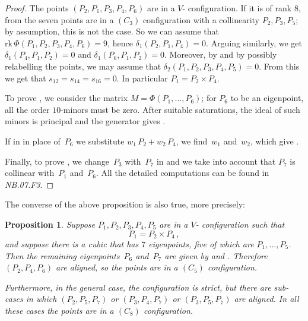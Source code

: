 \documentclass[a4paper, 11pt, reqno]{amsart}
\theoremstyle{plain}
\newtheorem{prop}[lemma]{Proposition}
\theoremstyle{definition}
\newcommand{\nb}[2]{\textsl{{NB}.{#1}.{#2}}}
\newcommand{\rk}{\ensuremath{\mathrm{rk}}}
\begin{document}
\begin{proof}
The points $(P_2, P_1, P_3, P_4, P_6)$ are in a
$V$- configuration. If it is of rank $8$, 
from  the seven points are in a $(C_3)$ configuration
with a collinearity $P_2, P_3,P_5$; by assumption, this is not the case. So
we can assume that $\rk \, \Phi(P_1, P_2, P_3, P_4, P_6) = 9$, hence $\delta_1(P_2, P_1, P_4)=0$.
Arguing similarly, we get $\delta_1(P_4, P_1, P_2) = 0$ and $\delta_1(P_6, P_1, P_2) = 0$. Moreover, by  and by possibly relabelling the points, we may assume that $\delta_2(P_1, P_2, P_3, P_4, P_5)=0$. From this we get that
$s_{12} = s_{14}=s_{16}=0$. In particular $P_1 = P_2 \times P_4$.

To prove , 
we consider the matrix $M = \Phi(P_1, \dots, P_6)$;
for $P_6$ to be an eigenpoint,
all the order $10$-minors must be zero. 
After suitable saturations, the ideal of such minors is principal and the generator gives .

If in  in place of~$P_6$ we substitute $w_1 \, P_2 + w_2 \, P_4$,
we find~$w_1$ and~$w_2$, which give .

Finally, to prove , we change~$P_3$ with~$P_7$ in  and we take into account that $P_7$ is collinear with~$P_1$ and~$P_6$. All the detailed computations can be found in \nb{07}{F3}.
\end{proof}
%
The converse of the above proposition is also true, more precisely:
\begin{prop}
   Suppose $P_1, P_2, P_3, P_4, P_5$ are in a $V$- configuration such that
%
\[
  P_1 = P_2 \times P_4 \,,
\]
%
and suppose there is a cubic that has $7$ eigenpoints, five of which are $P_1, \dotsc, P_5$. Then the remaining eigenpoints~$P_6$ and~$P_7$ are given by  and . Therefore $(P_2, P_4, P_6)$ are aligned, so the points are in a $(C_5)$ configuration. 

Furthermore, in the general case, the configuration is 
strict, but 
there are sub-cases in which $(P_2, P_5, P_7)$ or $(P_3, P_4, P_7)$ or $(P_3, P_5, P_7)$ are aligned. In all these cases the points are in a $(C_8)$ configuration.
\end{prop}
\end{document}
